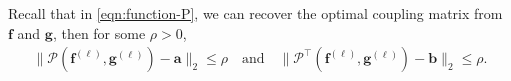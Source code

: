\begin{remark}\label{remark:conv-cond-parallel}
  Recall that in \cref{eqn:function-P}, we can recover the optimal coupling matrix from $\mathbf{f}$ and $\mathbf{g}$,
  then for some $\rho > 0$,
  \begin{equation*}
    \begin{aligned}
      \lVert
      \mathcal{P}\left(\mathbf{f}^{(\ell)}, \mathbf{g}^{(\ell)}\right) - \mathbf{a}
      \rVert_2 \le \rho
      \quad\text{and}\quad
      \lVert
      \mathcal{P}^\top \left(\mathbf{f}^{(\ell)}, \mathbf{g}^{(\ell)}\right) - \mathbf{b}
      \rVert_2 \le \rho.
    \end{aligned}
  \end{equation*}
\end{remark}
